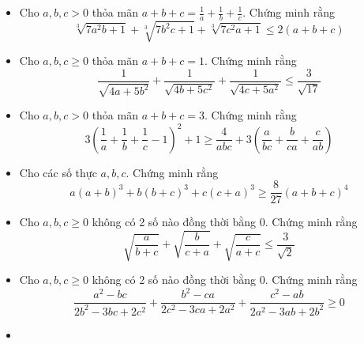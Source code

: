 \documentclass[11pt]{scrartcl}
\begin{document}
\begin{itemize}[label=, leftmargin=0em, itemsep=0.5em]
\begin{sol}
            \end{sol}
            \item\begin{btvn}
                Cho $a,b,c > 0$ thỏa mãn $a + b + c = \frac{1}{a} + \frac{1}{b} + \frac{1}{c}$. Chứng minh rằng
                \[
                    \sqrt[3]{7a^2b + 1} + \sqrt[3]{7b^2c + 1} + \sqrt[3]{7c^2a + 1} \leq 2(a + b + c)
                \]
            \end{btvn}
            \item\begin{btvn}
                Cho $a,b,c \geq 0$ thỏa mãn $a + b + c = 1$. Chứng minh rằng
                \[
                    \frac{1}{\sqrt{4a + 5b^2}} + \frac{1}{\sqrt{4b + 5c^2}} + \frac{1}{\sqrt{4c + 5a^2}} \leq \frac{3}{\sqrt{17}}
                \]
            \end{btvn}
            \item\begin{btvn}Cho $a,b,c > 0$ thỏa mãn $a + b + c = 3$. Chứng minh rằng
                \[
                    3\left(\frac{1}{a} + \frac{1}{b} + \frac{1}{c} - 1\right)^2 + 1 \geq \frac{4}{abc} + 3\left(\frac{a}{bc} +  \frac{b}{ca} + \frac{c}{ab}\right)
                \]
            \end{btvn}
            \item\begin{btvn}
                Cho các số thực $a,b,c$. Chứng minh rằng
                \[
                    a(a + b)^3 + b(b + c)^3 + c(c +a)^3 \geq \frac{8}{27}(a + b + c)^4
                \]
            \end{btvn}
            \item\begin{btvn}
                Cho $a,b,c \geq 0$ không có 2 số nào đồng thời bằng 0. Chứng minh rằng 
                \[
                    \sqrt{\frac{a}{b +c }} + \sqrt{\frac{b}{ c +a }} + \sqrt{\frac{c}{a + c}} \leq \frac{3}{\sqrt{2}}
                \]
            \end{btvn}
            \item\begin{btvn}
                Cho $a,b,c \geq 0$ không có 2 số nào đồng thời bằng 0. Chứng minh rằng
                \[
                    \frac{a^2 - bc}{2b^2 - 3bc + 2c^2} + \frac{b^2 - ca}{2c^2 - 3ca + 2a^2} + \frac{c^2 - ab}{2a^2 - 3ab + 2b^2} \geq 0
                \]
            \end{btvn}
            \item\begin{btvn}

\end{btvn}
\end{itemize}
\end{document}
